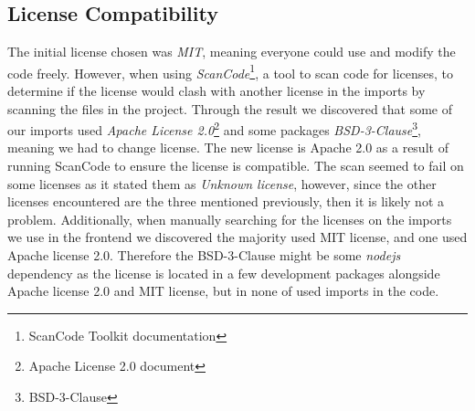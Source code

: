 \subsection{License Compatibility}
\label{subsec:license_compatability}
The initial license chosen was \textit{MIT}, meaning everyone could use and modify the code freely.
However, when using \textit{ScanCode}\footnote{ScanCode Toolkit documentation\cite{Scancode}}, a tool to scan code for licenses, to determine if the license would clash with another license in the imports by scanning the files in the project. Through the result we discovered that some of our imports used \textit{Apache License 2.0}\footnote{Apache License 2.0 document\cite{Apache2.0}} and some packages \textit{BSD-3-Clause}\footnote{BSD-3-Clause\cite{BSD3Clause}}, meaning we had to change license.
The new license is Apache 2.0 as a result of running ScanCode to ensure the license is compatible. The scan seemed to fail on some licenses as it stated them as \textit{Unknown license}, however, since the other licenses encountered are the three mentioned previously, then it is likely not a problem. Additionally, when manually searching for the licenses on the imports we use in the frontend we discovered the majority used MIT license, and one used Apache license 2.0. Therefore the BSD-3-Clause might be some \textit{nodejs} dependency as the license is located in a few development packages alongside Apache license 2.0 and MIT license, but in none of used imports in the code.



